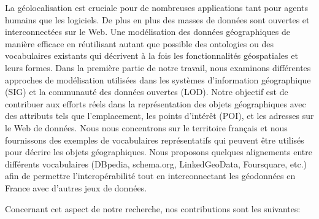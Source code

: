 \documentclass[a4paper,11pt,twoside]{report}
\begin{document}
La géolocalisation est cruciale pour de nombreuses applications tant pour agents humains que les logiciels. De plus en plus des masses de données sont ouvertes et interconnectées sur le Web. Une modélisation des données géographiques de manière efficace en réutilisant autant que possible des ontologies ou des vocabulaires existants qui décrivent à la fois les fonctionnalités géospatiales et leurs formes. Dans la première partie de notre travail, nous examinons différentes approches de modélisation utilisées dans les systèmes d'information géographique (SIG) et la communauté des données ouvertes (LOD). Notre objectif est de contribuer aux efforts réels dans la représentation des objets géographiques avec des attributs tels que l'emplacement, les points d'intérêt (POI), et les adresses sur le Web de données. Nous nous concentrons sur le territoire français et nous fournissons des exemples de vocabulaires représentatifs qui peuvent être utilisés pour décrire les objets géographiques. Nous proposons quelques alignements entre différents vocabulaires (DBpedia, schema.org, LinkedGeoData, Foursquare, etc.) afin de permettre l'interopérabilité tout en interconnectant les géodonnées en France avec d'autres jeux de données.
 
Concernant cet aspect de notre recherche, nos contributions sont les suivantes:  
\end{document}
